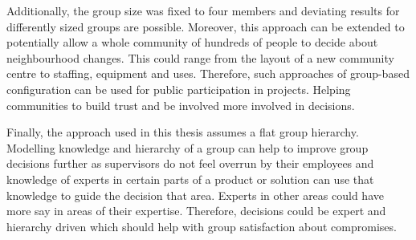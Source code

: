 Additionally, the group size was fixed to four members and deviating results for differently sized groups are possible. Moreover, this approach can be extended to potentially allow a whole community of hundreds of people to decide about neighbourhood changes. This could range from the layout of a new community centre to staffing, equipment and uses. Therefore, such approaches of group-based configuration can be used for public participation in projects. Helping communities to build trust and be involved more involved in decisions.

Finally, the approach used in this thesis assumes a flat group hierarchy. Modelling knowledge and hierarchy of a group can help to improve group decisions further as supervisors do not feel overrun by their employees and knowledge of experts in certain parts of a product or solution can use that knowledge to guide the decision that area. Experts in other areas could have more say in areas of their expertise. Therefore, decisions could be expert and hierarchy driven which should help with group satisfaction about compromises.